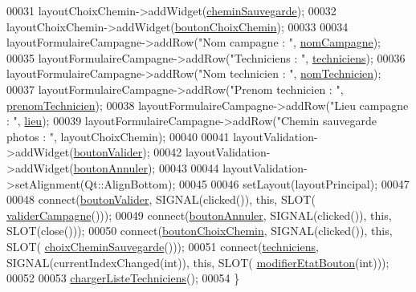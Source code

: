 \begin{DoxyCode}
00031     layoutChoixChemin->addWidget(\hyperlink{class_i_h_m_creation_campagne_a95c12e2d42063f9c510704b87e3357da}{cheminSauvegarde});
00032     layoutChoixChemin->addWidget(\hyperlink{class_i_h_m_creation_campagne_ab709b06a83d8e1ebf9c920e7c60e2d79}{boutonChoixChemin});
00033 
00034     layoutFormulaireCampagne->addRow(\textcolor{stringliteral}{"Nom campagne : "}, \hyperlink{class_i_h_m_creation_campagne_a6f07f2571a10f035c7b6a3ef1daefdab}{nomCampagne});
00035     layoutFormulaireCampagne->addRow(\textcolor{stringliteral}{"Techniciens : "}, \hyperlink{class_i_h_m_creation_campagne_a8235e7a18cda1298be624a59a4cc1a56}{techniciens});
00036     layoutFormulaireCampagne->addRow(\textcolor{stringliteral}{"Nom technicien : "}, \hyperlink{class_i_h_m_creation_campagne_a5546fee9a51daceb1b719b105427dfe9}{nomTechnicien});
00037     layoutFormulaireCampagne->addRow(\textcolor{stringliteral}{"Prenom technicien : "}, \hyperlink{class_i_h_m_creation_campagne_a95e0a4f224110a79731e947baa505b7e}{prenomTechnicien});
00038     layoutFormulaireCampagne->addRow(\textcolor{stringliteral}{"Lieu campagne : "}, \hyperlink{class_i_h_m_creation_campagne_af68a722acc97a1011ff82752169a2ac8}{lieu});
00039     layoutFormulaireCampagne->addRow(\textcolor{stringliteral}{"Chemin sauvegarde photos : "}, layoutChoixChemin);
00040 
00041     layoutValidation->addWidget(\hyperlink{class_i_h_m_creation_campagne_a7c1dbc0141ba19b9ac16ea1444cd5d6f}{boutonValider});
00042     layoutValidation->addWidget(\hyperlink{class_i_h_m_creation_campagne_ab20ebd5f09b98103c682ed2e1b192a1d}{boutonAnnuler});
00043 
00044     layoutValidation->setAlignment(Qt::AlignBottom);
00045 
00046     setLayout(layoutPrincipal);
00047 
00048     connect(\hyperlink{class_i_h_m_creation_campagne_a7c1dbc0141ba19b9ac16ea1444cd5d6f}{boutonValider}, SIGNAL(clicked()), \textcolor{keyword}{this}, SLOT(
      \hyperlink{class_i_h_m_creation_campagne_ad5c63453b1b8d1099a43ff3522244072}{validerCampagne}()));
00049     connect(\hyperlink{class_i_h_m_creation_campagne_ab20ebd5f09b98103c682ed2e1b192a1d}{boutonAnnuler}, SIGNAL(clicked()), \textcolor{keyword}{this}, SLOT(close()));
00050     connect(\hyperlink{class_i_h_m_creation_campagne_ab709b06a83d8e1ebf9c920e7c60e2d79}{boutonChoixChemin}, SIGNAL(clicked()), \textcolor{keyword}{this}, SLOT(
      \hyperlink{class_i_h_m_creation_campagne_aceedbe44750998444120ae6343bbdcc6}{choixCheminSauvegarde}()));
00051     connect(\hyperlink{class_i_h_m_creation_campagne_a8235e7a18cda1298be624a59a4cc1a56}{techniciens}, SIGNAL(currentIndexChanged(\textcolor{keywordtype}{int})), \textcolor{keyword}{this}, SLOT(
      \hyperlink{class_i_h_m_creation_campagne_a93395fef027960e7ab0d5c75a76e7414}{modifierEtatBouton}(\textcolor{keywordtype}{int})));
00052 
00053     \hyperlink{class_i_h_m_creation_campagne_a0648a6013cec5557150d0addf30e2bbc}{chargerListeTechniciens}();
00054 \}
\end{DoxyCode}
\mbox{\label{class_i_h_m_creation_campagne_af2f85377637b15ccb2215b4b1f96b574}} 
